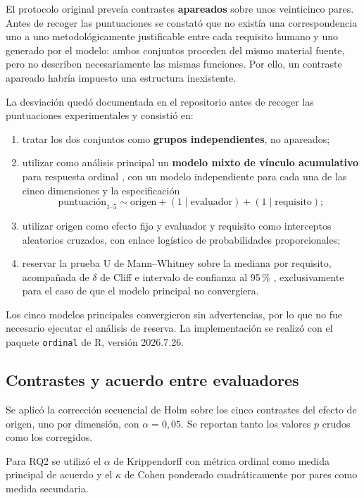 \documentclass[runningheads]{llncs}
\begin{document}
El protocolo original preve\'ia contrastes \textbf{apareados} sobre unos
veinticinco pares. Antes de recoger las puntuaciones se constat\'o que no exist\'ia
una correspondencia uno a uno metodol\'ogicamente justificable entre cada
requisito humano y uno generado por el modelo: ambos conjuntos proceden del mismo
material fuente, pero no describen necesariamente las mismas funciones. Por ello,
un contraste apareado habr\'ia impuesto una estructura inexistente.

La desviaci\'on qued\'o documentada en el repositorio antes de recoger las
puntuaciones experimentales y consisti\'o en:

\begin{enumerate}
\item tratar los dos conjuntos como \textbf{grupos independientes}, no apareados;
\item utilizar como an\'alisis principal un \textbf{modelo mixto de v\'inculo
acumulativo} para respuesta ordinal \cite{agresti2010}, con un modelo independiente
para cada una de las cinco dimensiones y la especificaci\'on
\[
\text{puntuaci\'on}_{1\text{--}5}
\sim
\text{origen}
+
(1 \mid \text{evaluador})
+
(1 \mid \text{requisito});
\]
\item utilizar origen como efecto fijo y evaluador y requisito como interceptos
aleatorios cruzados, con enlace log\'istico de probabilidades proporcionales;
\item reservar la prueba U de Mann--Whitney sobre la mediana por requisito,
acompa\~nada de $\delta$ de Cliff e intervalo de confianza al 95\,\%
\cite{cliff1993}, exclusivamente para el caso de que el modelo principal no
convergiera.
\end{enumerate}

Los cinco modelos principales convergieron sin advertencias, por lo que no fue
necesario ejecutar el an\'alisis de reserva. La implementaci\'on se realiz\'o con
el paquete \texttt{ordinal} de R, versi\'on 2026.7.26.

\subsection{Contrastes y acuerdo entre evaluadores}

Se aplic\'o la correcci\'on secuencial de Holm \cite{holm1979} sobre los cinco
contrastes del efecto de origen, uno por dimensi\'on, con $\alpha=0{,}05$. Se
reportan tanto los valores $p$ crudos como los corregidos.

Para RQ2 se utiliz\'o el $\alpha$ de Krippendorff con m\'etrica ordinal
\cite{hayes2007} como medida principal de acuerdo y el $\kappa$ de Cohen ponderado
cuadr\'aticamente \cite{cohen1968} por pares como medida secundaria.
\end{document}
